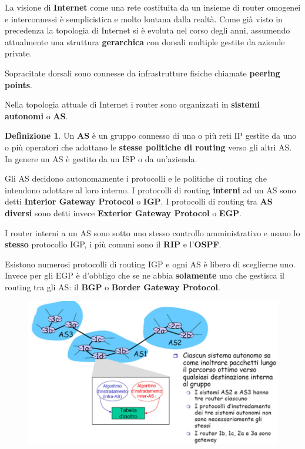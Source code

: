 \documentclass[11pt,a4paper,oneside]{book}
\theoremstyle{definition}
\newtheorem{definition}{Definizione}[section]
\begin{document}
La visione di \textbf{Internet} come una rete costituita da un insieme di router omogenei e
interconnessi è semplicistica e molto lontana dalla realtà. Come già visto in precedenza la topologia di Internet si è evoluta nel corso degli anni, assumendo attualmente una struttura \textbf{gerarchica} con dorsali multiple gestite da aziende private.

Sopracitate dorsali sono connesse da infrastrutture fisiche chiamate \textbf{peering points}.

Nella topologia attuale di Internet i router sono organizzati in \textbf{sistemi autonomi} o \textbf{AS}.

\theoremstyle{definition}
\begin{definition}
	Un \textbf{AS} è un gruppo connesso di una o più reti IP gestite da uno o più
	operatori che adottano le \textbf{stesse politiche di routing} verso gli altri AS.
	In genere un AS è gestito da un ISP o da un’azienda.
\end{definition}

Gli AS decidono autonomamente i protocolli e le politiche di routing che
intendono adottare al loro interno. I protocolli di routing \textbf{interni} ad un AS sono detti \textbf{Interior Gateway Protocol} o \textbf{IGP}. I protocolli di routing tra \textbf{AS diversi} sono detti invece \textbf{Exterior Gateway Protocol} o \textbf{EGP}.

I router interni a un AS sono sotto uno stesso controllo amministrativo e usano lo \textbf{stesso} protocollo IGP, i più comuni sono il \textbf{RIP} e l'\textbf{OSPF}.

Esistono numerosi protocolli di routing IGP e ogni AS è libero di sceglierne uno. Invece per gli EGP è d'obbligo che se ne abbia \textbf{solamente} uno che gestisca il routing tra gli AS: il \textbf{BGP} o \textbf{Border Gateway Protocol}.

\pagebreak

\begin{figure}[!h]
	\includegraphics[scale=0.37]{Immagini/ASes.png}
	\centering
\end{figure}
\end{document}
